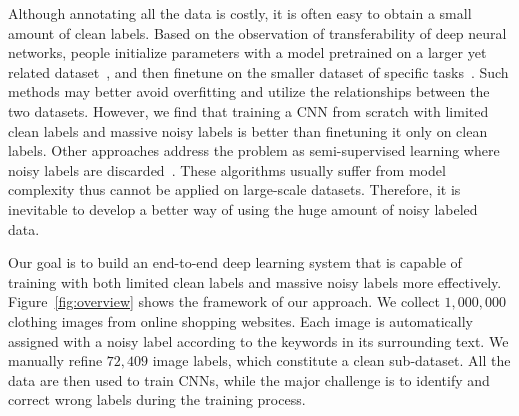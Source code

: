 \documentclass[10pt,twocolumn,letterpaper]{article}
\begin{document}
Although annotating all the data is costly, it is often easy to obtain a small amount of clean labels. Based on the observation of transferability of deep neural networks, people initialize parameters with a model pretrained on a larger yet related dataset~\cite{krizhevsky2012imagenet}, and then finetune on the smaller dataset of specific tasks~\cite{oquab2014learning,azizpour2014generic,donahue2013decaf}. Such methods may better avoid overfitting and utilize the relationships between the two datasets. However, we find that training a CNN from scratch with limited clean labels and massive noisy labels is better than finetuning it only on clean labels. Other approaches address the problem as semi-supervised learning where noisy labels are discarded~\cite{zhu2002learning}. These algorithms usually suffer from model complexity thus cannot be applied on large-scale datasets. Therefore, it is inevitable to develop a better way of using the huge amount of noisy labeled data.

Our goal is to build an end-to-end deep learning system that is capable of training with both limited clean labels and massive noisy labels more effectively. Figure~\ref{fig:overview} shows the framework of our approach. We collect $1,000,000$ clothing images from online shopping websites. Each image is automatically assigned with a noisy label according to the keywords in its surrounding text. We manually refine $72,409$ image labels, which constitute a clean sub-dataset. All the data are then used to train CNNs, while the major challenge is to identify and correct wrong labels during the training process.
\end{document}

